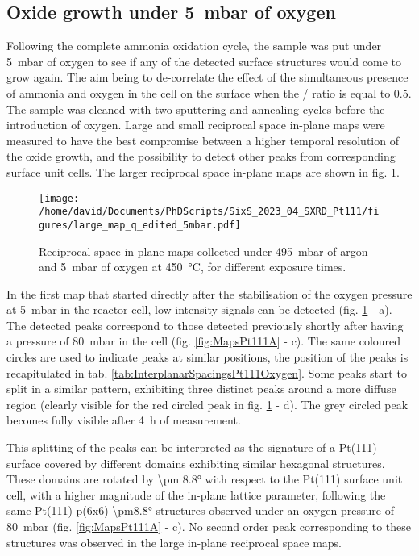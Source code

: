 \subsection{Oxide growth under \qty{5}{\milli\bar} of oxygen}

Following the complete ammonia oxidation cycle, the sample was put under \qty{5}{\milli\bar} of oxygen to see if any of the detected surface structures would come to grow again.
The aim being to de-correlate the effect of the simultaneous presence of ammonia and oxygen in the cell on the surface when the / ratio is equal to \num{0.5}.
The sample was cleaned with two sputtering and annealing cycles before the introduction of oxygen.
Large and small reciprocal space in-plane maps were measured to have the best compromise between a higher temporal resolution of the oxide growth, and the possibility to detect other peaks from corresponding surface unit cells.
The larger reciprocal space in-plane maps are shown in fig. \ref{fig:LargeMapsPt111LowOxygen}.

\begin{figure}[!htb]
    \centering
    \texttt{[image: /home/david/Documents/PhDScripts/SixS\_2023\_04\_SXRD\_Pt111/figures/large\_map\_q\_edited\_5mbar.pdf]}
    \caption{
        Reciprocal space in-plane maps collected under \qty{495}{\milli\bar} of argon and \qty{5}{\milli\bar} of oxygen at \qty{450}{\degreeCelsius}, for different exposure times.
    }
    \label{fig:LargeMapsPt111LowOxygen}
\end{figure}

In the first map that started directly after the stabilisation of the oxygen pressure at \qty{5}{\milli\bar} in the reactor cell, low intensity signals can be detected (fig. \ref{fig:LargeMapsPt111LowOxygen} - a).
The detected peaks correspond to those detected previously shortly after having a pressure of \qty{80}{\milli\bar} in the cell (fig. \ref{fig:MapsPt111A} - c).
The same coloured circles are used to indicate peaks at similar positions, the position of the peaks is recapitulated in tab. \ref{tab:InterplanarSpacingsPt111Oxygen}.
Some peaks start to split in a similar pattern, exhibiting three distinct peaks around a more diffuse region (clearly visible for the red circled peak in fig. \ref{fig:LargeMapsPt111LowOxygen} - d).
The grey circled peak becomes fully visible after \qty{4}{\hour} of measurement.

This splitting of the peaks can be interpreted as the signature of a Pt(111) surface covered by different domains exhibiting similar hexagonal structures.
These domains are rotated by \ang{\pm 8.8} with respect to the Pt(111) surface unit cell, with a higher magnitude of the in-plane lattice parameter, following the same Pt(111)-p(6x6)-\ang{\pm8.8} structures observed under an oxygen pressure of \qty{80}{\milli\bar} (fig. \ref{fig:MapsPt111A} - c).
No second order peak corresponding to these structures was observed in the large in-plane reciprocal space maps.

